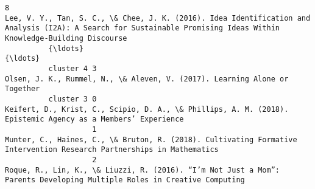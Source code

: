 \documentclass[journal,twocolumn]{IEEEtran}
\begin{document}
\begin{Verbatim}[commandchars=\\\{\}]
                    8                                                                                                                                                                                                                                                           Lee, V. Y., Tan, S. C., \& Chee, J. K. (2016). Idea Identification and Analysis (I2A): A Search for Sustainable Promising Ideas Within Knowledge-Building Discourse 
          {\ldots}                                                                                                                                                                                                                                                                                                                                                                                                                                   {\ldots}
          cluster 4 3                                                                                                                                                                                                                                                                                                                                                     Olsen, J. K., Rummel, N., \& Aleven, V. (2017). Learning Alone or Together
          cluster 3 0                                                                                                                                                                                                                                                                                                                    Keifert, D., Krist, C., Scipio, D. A., \& Phillips, A. M. (2018). Epistemic Agency as a Members’ Experience
                    1                                                                                                                                                                                                                                                                                                          Munter, C., Haines, C., \& Bruton, R. (2018). Cultivating Formative Intervention Research Partnerships in Mathematics
                    2                                                                                                                                                                                                                                                                                                       Roque, R., Lin, K., \& Liuzzi, R. (2016). “I’m Not Just a Mom”: Parents Developing Multiple Roles in Creative Computing 

\end{Verbatim}
\end{document}
